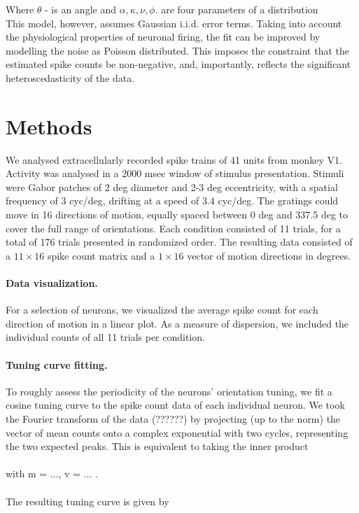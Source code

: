 \documentclass[10pt]{article}
\begin{document}
Where $\theta$ - is an angle and  $\alpha, \kappa, \nu, \phi.$ are four parameters of a distribution\\
This model, however, assumes Gaussian i.i.d. error terms. Taking into account the physiological properties of neuronal firing, the fit can be improved by modelling the noise as Poisson distributed. This imposes the constraint that the estimated spike counts be non-negative, and, importantly, reflects the significant heteroscedasticity of the data.


\section*{Methods}

We analysed extracellularly recorded spike trains of 41 units from monkey V1. Activity was analysed in a 2000 msec window of stimulus presentation. Stimuli were Gabor patches of 2 deg diameter and 2-3 deg eccentricity, with a spatial frequency of 3 cyc/deg, drifting at a speed of 3.4 cyc/deg. The gratings could move in 16 directions of motion, equally spaced between 0 deg and 337.5 deg to cover the full range of orientations. Each condition consisted of 11 trials, for a total of 176 trials presented in randomized order. The resulting data consisted of a $11\times16$ spike count matrix and a $1\times16$ vector of motion directions in degrees.\\

\paragraph{Data visualization.} For a selection of neurons, we visualized the average spike count for each direction of motion in a linear plot. As a measure of dispersion, we included the individual counts of all 11 trials per condition.

\paragraph{Tuning curve fitting.} To roughly assess the periodicity of the neurons' orientation tuning, we fit a cosine tuning curve to the spike count data of each individual neuron. We took the Fourier transform of the data (??????) by projecting (up to the norm) the vector of mean counts onto a complex exponential with two cycles, representing the two expected peaks. This is equivalent to taking the inner product \\ \\
with m = ...,  v = ... . \\ \\
The resulting tuning curve is given by \\
\end{document}
